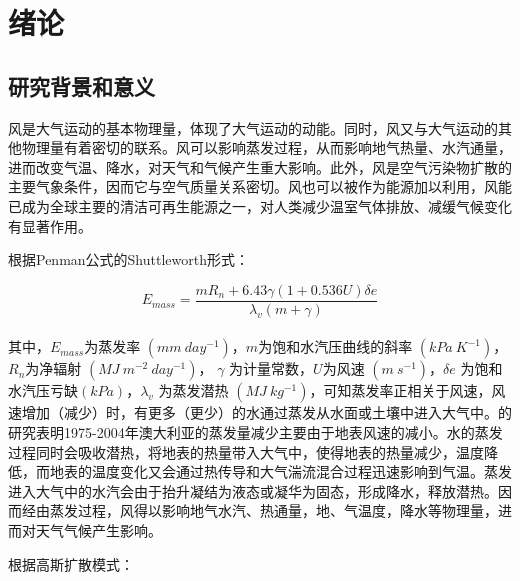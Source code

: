 
\chapter{绪论}\label{chap:intro}

\section{研究背景和意义}

风是大气运动的基本物理量，体现了大气运动的动能。同时，风又与大气运动的其他物理量有着密切的联系。风可以影响蒸发过程，从而影响地气热量、水汽通量，进而改变气温、降水，对天气和气候产生重大影响。此外，风是空气污染物扩散的主要气象条件，因而它与空气质量关系密切。风也可以被作为能源加以利用，风能已成为全球主要的清洁可再生能源之一，对人类减少温室气体排放、减缓气候变化有显著作用。

根据Penman公式的Shuttleworth形式\citep{shuttleworth1993evaporation}：

\begin{equation} \label{eq:penman}
E_{mass} = \frac{mR_{n} + 6.43 \gamma \left( 1 + 0.536 U \right) \delta e }{\lambda_{v} \left(m + \gamma \right)}
\end{equation} ~\\
其中，$E_{mass}$为蒸发率 $(mm ~ day^{-1})$，$m$为饱和水汽压曲线的斜率 $(kPa ~ K^{-1})$，$R_{n}$为净辐射 $(MJ ~ m^{-2} ~ day^{-1})$， $\gamma$ 为计量常数，$U$为风速 $(m ~ s^{-1})$，$\delta e$ 为饱和水汽压亏缺$ (kPa)$，$\lambda_{v} $ 为蒸发潜热 $(MJ ~ kg^{−1})$，可知蒸发率正相关于风速，风速增加（减少）时，有更多（更少）的水通过蒸发从水面或土壤中进入大气中。\citet{roderick2007attribution}的研究表明1975-2004年澳大利亚的蒸发量减少主要由于地表风速的减小。水的蒸发过程同时会吸收潜热，将地表的热量带入大气中，使得地表的热量减少，温度降低，而地表的温度变化又会通过热传导和大气湍流混合过程迅速影响到气温。蒸发进入大气中的水汽会由于抬升凝结为液态或凝华为固态，形成降水，释放潜热。因而经由蒸发过程，风得以影响地气水汽、热通量，地、气温度，降水等物理量，进而对天气气候产生影响。

根据高斯扩散模式\citep{beychok2005fundamentals}：

